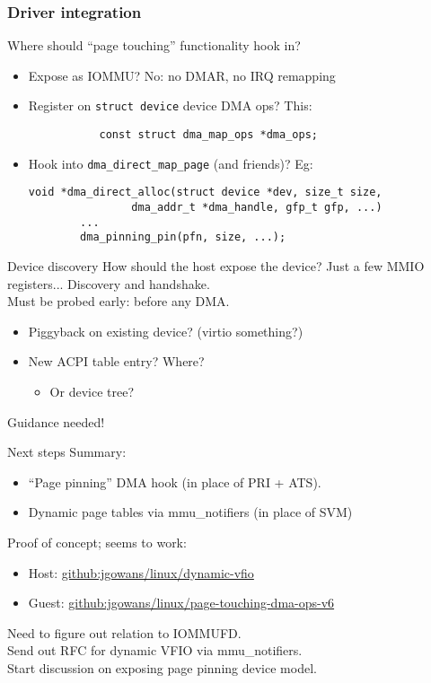 \documentclass{beamer}
\begin{document}
\begin{frame}[fragile]
  \frametitle{Driver integration}
  Where should ``page touching'' functionality hook in?
  \begin{itemize}
    \item Expose as IOMMU? No: no DMAR, no IRQ remapping
    \item Register on \texttt{struct device} device DMA ops? This:
      \begin{verbatim}
           const struct dma_map_ops *dma_ops;
      \end{verbatim}
    \item Hook into \texttt{dma\_direct\_map\_page} (and friends)? Eg:\\
      \begin{verbatim}
void *dma_direct_alloc(struct device *dev, size_t size,
                dma_addr_t *dma_handle, gfp_t gfp, ...)
        ...
        dma_pinning_pin(pfn, size, ...);
      \end{verbatim}
  \end{itemize}
\end{frame}

\begin{frame}{Device discovery}
  How should the host expose the device?
  Just a few MMIO registers... Discovery and handshake.\\
  
  Must be probed early: before any DMA.\\
  \begin{itemize}
    \item Piggyback on existing device? (virtio something?)
    \item New ACPI table entry? Where?
      \begin{itemize}
        \item Or device tree?
      \end{itemize}
  \end{itemize}
  Guidance needed!
\end{frame}

\begin{frame}{Next steps}
  Summary:
  \begin{itemize}
    \item ``Page pinning'' DMA hook (in place of PRI + ATS).
    \item Dynamic page tables via mmu\_notifiers (in place of SVM)
  \end{itemize}
  Proof of concept; seems to work:
  \begin{itemize}
    \item Host: \href{https://github.com/jgowans/linux/tree/dynamic-vfio}{github:jgowans/linux/dynamic-vfio}
    \item Guest: \href{https://github.com/jgowans/linux/tree/page-touching-dma-ops-v6}{github:jgowans/linux/page-touching-dma-ops-v6}
  \end{itemize}
  Need to figure out relation to IOMMUFD.\\
 
  Send out RFC for dynamic VFIO via mmu\_notifiers.\\
 
  Start discussion on exposing page pinning device model.
\end{frame}
\end{document}
